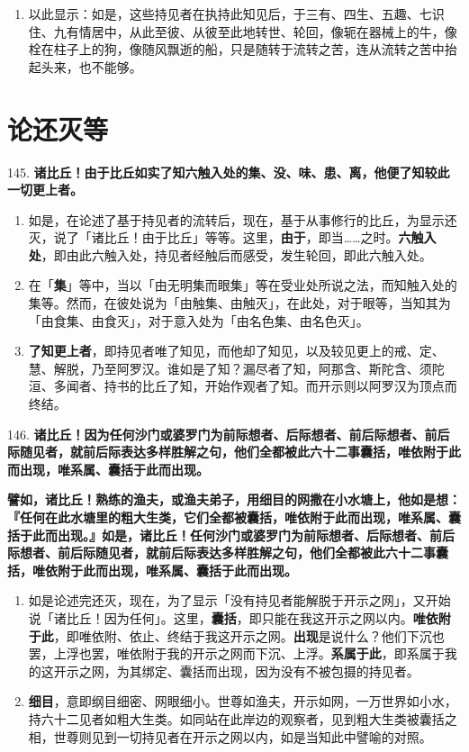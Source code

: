 \begin{enumerate}
\item 以此显示：如是，这些持见者在执持此知见后，于三有、四生、五趣、七识住、九有情居中，从此至彼、从彼至此地转世、轮回，像轭在器械上的牛，像栓在柱子上的狗，像随风飘逝的船，只是随转于流转之苦，连从流转之苦中抬起头来，也不能够。\end{enumerate}

\section{论还灭等}

{\Large 145.} \textbf{诸比丘！由于比丘如实了知六触入处的集、没、味、患、离，他便了知较此一切更上者。}

\begin{enumerate}\item 如是，在论述了基于持见者的流转后，现在，基于从事修行的比丘，为显示还灭，说了「诸比丘！由于比丘」等等。这里，\textbf{由于}，即当……之时。\textbf{六触入处}，即由此六触入处，持见者经触后而感受，发生轮回，即此六触入处。
\item 在「\textbf{集}」等中，当以「由无明集而眼集」等在受业处所说之法，而知触入处的集等。然而，在彼处说为「由触集、由触灭」，在此处，对于眼等，当知其为「由食集、由食灭」，对于意入处为「由名色集、由名色灭」。
\item \textbf{了知更上者}，即持见者唯了知见，而他却了知见，以及较见更上的戒、定、慧、解脱，乃至阿罗汉。谁如是了知？漏尽者了知，阿那含、斯陀含、须陀洹、多闻者、持书的比丘了知，开始作观者了知。而开示则以阿罗汉为顶点而终结。\end{enumerate}

{\Large 146.} \textbf{诸比丘！因为任何沙门或婆罗门为前际想者、后际想者、前后际想者、前后际随见者，就前后际表达多样胜解之句，他们全都被此六十二事囊括，唯依附于此而出现，唯系属、囊括于此而出现。}

\textbf{譬如，诸比丘！熟练的渔夫，或渔夫弟子，用细目的网撒在小水塘上，他如是想：『任何在此水塘里的粗大生类，它们全都被囊括，唯依附于此而出现，唯系属、囊括于此而出现。』如是，诸比丘！任何沙门或婆罗门为前际想者、后际想者、前后际想者、前后际随见者，就前后际表达多样胜解之句，他们全都被此六十二事囊括，唯依附于此而出现，唯系属、囊括于此而出现。}

\begin{enumerate}\item 如是论述完还灭，现在，为了显示「没有持见者能解脱于开示之网」，又开始说「诸比丘！因为任何」。这里，\textbf{囊括}，即只能在我这开示之网以内。\textbf{唯依附于此}，即唯依附、依止、终结于我这开示之网。\textbf{出现}是说什么？他们下沉也罢，上浮也罢，唯依附于我的开示之网而下沉、上浮。\textbf{系属于此}，即系属于我的这开示之网，为其绑定、囊括而出现，因为没有不被包摄的持见者。
\item \textbf{细目}，意即纲目细密、网眼细小。世尊如渔夫，开示如网，一万世界如小水，持六十二见者如粗大生类。如同站在此岸边的观察者，见到粗大生类被囊括之相，世尊则见到一切持见者在开示之网以内，如是当知此中譬喻的对照。\end{enumerate}

